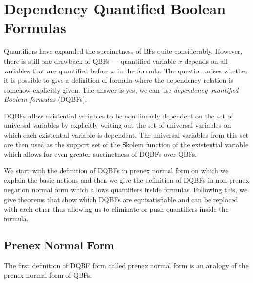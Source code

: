 \documentclass[
  digital, %
  color,
  twoside, %
  table,   %
  nolof,     %
  nolot,     %
]{fithesis3}
\theoremstyle{definition}
\theoremstyle{remark}
\begin{document}
\section{Dependency Quantified Boolean Formulas}
Quantifiers have expanded the succinctness of BFs quite considerably. However, there is still one drawback of QBFs --- quantified variable $x$ depends on all variables that are quantified before $x$ in the formula. The question arises whether it is possible to give a definition of formula where the dependency relation is somehow explicitly given. The answer is yes, we can use \emph{dependency quantified Boolean formulas} (DQBFs).

DQBFs allow existential variables to be non-linearly dependent on the set of universal variables by explicitly writing out the set of universal variables on which each existential variable is dependent. The universal variables from this set are then used as the support set of the Skolem function of the existential variable which allows for even greater succinctness of DQBFs over QBFs.  

We start with the definition of DQBFs in prenex normal form on which we explain the basic notions and then we give the definition of DQBFs in non-prenex negation normal form which allows quantifiers inside formulas. Following this, we give theorems that show which DQBFs are equisatisfiable and can be replaced with each other thus allowing us to eliminate or push quantifiers inside the formula.

\subsection{Prenex Normal Form}
The first definition of DQBF form called prenex normal form is an analogy of the prenex normal form of QBFs.
\end{document}
